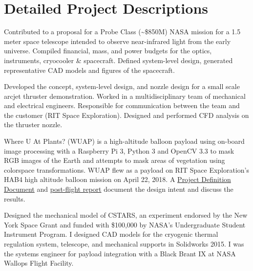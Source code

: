 \documentclass[10pt,final,sans]{resume}
\begin{document}
\break
\section{Detailed Project Descriptions}

Contributed to a proposal for a Probe Class (\textasciitilde\$850M) NASA mission for a 1.5 meter space telescope intended to observe near-infrared light from the early universe. Compiled financial, mass, and power budgets for the optics, instruments, cryocooler \& spacecraft. Defined system-level design, generated representative CAD models and figures of the spacecraft.

Developed the concept, system-level design, and nozzle design for a small scale arcjet thruster demonstration. Worked in a multidisciplinary team of mechanical and electrical engineers. Responsible for communication between the team and the customer (RIT Space Exploration). Designed and performed CFD analysis on the thruster nozzle.

Where U At Plants? (WUAP) is a high-altitude balloon payload using on-board image processing with a Raspberry Pi 3, Python 3 and OpenCV 3.3 to mask RGB images of the Earth and attempts to mask areas of vegetation using colorspace transformations. WUAP flew as a payload on RIT Space Exploration's HAB4 high altitude balloon mission on April 22, 2018. A \href{https://github.com/RIT-Space-Exploration/hab-cv/blob/master/reports/Project%20Definition%20Document/hab-cv.pdf}{Project Definition Document} and \href{https://github.com/RIT-Space-Exploration/hab-cv/blob/master/reports/HAB4%20Post%20Flight%20Report/report_wuap_postflight-hab4.md}{post-flight report} document the design intent and discuss the results.

Designed the mechanical model of CSTARS, an experiment endorsed by the New York Space Grant and funded with \$100,000 by NASA's Undergraduate Student Instrument Program. I designed CAD models for the cryogenic thermal regulation system, telescope, and mechanical supports in Solidworks 2015. I was the systems engineer for payload integration with a Black Brant IX at NASA Wallops Flight Facility.
\end{document}
